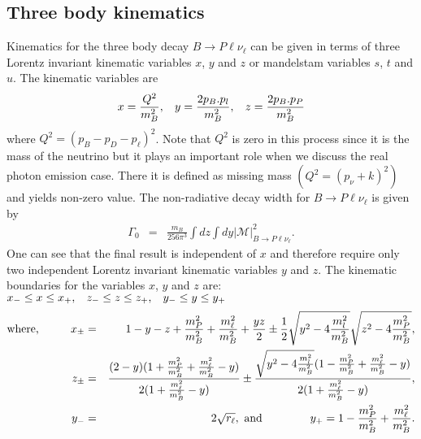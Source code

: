 \documentclass[a4paper,11pt]{article}
\begin{document}
		\subsection{Three body kinematics }
		Kinematics for the three body decay $B\to P \ell \nu_{\ell}$
		 can be given in terms of three Lorentz invariant kinematic variables $x$, $y$ and $z$ or mandelstam variables $s$, $t$ and $u$. The kinematic variables are 
		\begin{eqnarray}
		x=\frac{Q^{2}}{m_{B}^{2}}, \hspace{0.3cm} y=\frac{2 p_{B}.p_{l}}{m_{B}^{2}}, \hspace{0.3cm}  z=\frac{2 p_{B}.p_{P}}{m_{B}^{2}}
		\end{eqnarray}
		where $Q^{2}=(p_{B}-p_{D}-p_{\ell})^{2}$. Note that $Q^{2}$ is zero in this process since it is the mass of the neutrino but it plays an important role when we discuss the real photon emission case. There it is defined as missing mass $(Q^{2}=(p_{\nu}+k)^{2})$ and yields non-zero value. The non-radiative decay width for $B\rightarrow P\ell \nu_\ell$ is given by
		{\small
		\begin{eqnarray}
		\Gamma_{0}
		&=& \frac{m_{B}}{256 \pi^{3}}\int dz \int dy \left|\mathcal{M}\right|_{B\to P \ell \nu_{\ell}}^{2}.
		\end{eqnarray}}
		One can see that the final result is independent of $x$ and therefore require only two independent Lorentz invariant kinematic variables $y$ and $z$. The kinematic boundaries for the variables $x$, $y$ and $z$ are: $x_{-}\leq x \leq x_{+} , \hspace{0.3cm} z_{-}\leq z \leq z_{+}  , \hspace{0.3cm} y_{-}\leq y \leq y_{+}$
		{\small
		\begin{eqnarray}
		\text{where,}\hspace{1cm}x_{\pm}&=& 1-y-z+\frac{m_{P}^{2}}{m_{B}^{2}}+\frac{m_{\ell}^{2}}{m_{B}^{2}}+\frac{yz}{2}\pm \frac{1}{2} \sqrt{y^{2}-4\frac{m_{l}^{2}}{m_{B}^{2}}}\sqrt{z^{2}-4\frac{m_{P}^{2}}{m_{B}^{2}}},\nonumber\\
		z_{\pm}&=& \frac{(2-y)(1+\frac{m_{P}^{2}}{m_{B}^{2}}+\frac{m_{\ell}^{2}}{m_{B}^{2}}-y)}{2(1+\frac{m_{\ell}^{2}}{m_{B}^{2}}-y)}\pm \frac{\sqrt{y^{2}-4\frac{m_{l}^{2}}{m_{B}^{2}}}(1-\frac{m_{P}^{2}}{m_{B}^{2}}+\frac{m_{\ell}^{2}}{m_{B}^{2}}-y)}{2(1+\frac{m_{\ell}^{2}}{m_{B}^{2}}-y)},\nonumber\\
		y_{-}&=& 2\sqrt{r_{\ell}}, \text{    and} \hspace{1.5cm}  y_{+}=1-\frac{m_{P}^{2}}{m_{B}^{2}}+\frac{m_{\ell}^{2}}{m_{B}^{2}}.\nonumber
		\end{eqnarray}
		}
\end{document}

